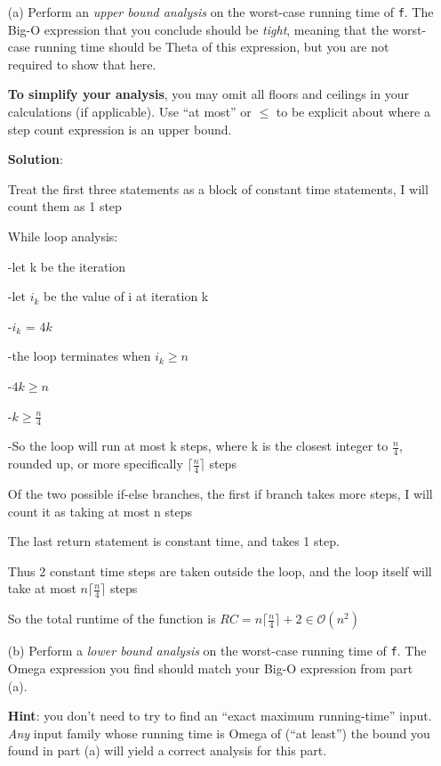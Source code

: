 \documentclass{article}
\newcommand{\cO}{\mathcal{O}}
\begin{document}
\begin{enumerate}

\item[(a)]
Perform an \emph{upper bound analysis} on the worst-case running time of \texttt{f}.
The Big-O expression that you conclude should be \emph{tight}, meaning that the worst-case running time should be Theta of this expression, but you are not required to show that here.

\textbf{To simplify your analysis}, you may omit all floors and ceilings in your calculations (if applicable).
Use ``at most'' or $\leq$ to be explicit about where a step count expression is an upper bound.

\textbf{Solution}:

Treat the first three statements as a block of constant time statements, I will count them as 1 step

While loop analysis:

-let k be the iteration

-let $i_k$ be the value of i at iteration k

-$i_k$ = $4k$

-the loop terminates when $i_k \geq n$

-$4k \geq n$

-$k \geq \frac{n}{4}$

-So the loop will run at most k steps, where k is the closest integer to $\frac{n}{4}$, rounded up, or more specifically $\lceil \frac{n}{4} \rceil$ steps

Of the two possible if-else branches, the first if branch takes more steps, I will count it as taking at most n steps

The last return statement is constant time, and takes 1 step.

Thus 2 constant time steps are taken outside the loop, and the loop itself will take at most $n \lceil \frac{n}{4} \rceil$ steps

So the total runtime of the function is $RC = n \lceil \frac{n}{4} \rceil + 2 \in \cO (n^2)$


\item[(b)]
Perform a \emph{lower bound analysis} on the worst-case running time of \texttt{f}.
The Omega expression you find should match your Big-O expression from part (a).

\textbf{Hint}: you don't need to try to find an ``exact maximum running-time'' input. \emph{Any} input family whose running time is Omega of (``at least'') the bound you found in part (a) will yield a correct analysis for this part.


\end{enumerate}
\end{document}
